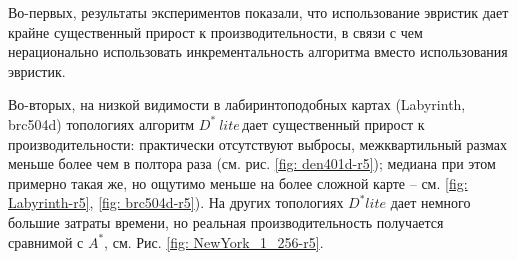 \documentclass[11pt]{article}
\newcommand{\dstarlite}{\(D^*\ lite\)\,}
\begin{document}
    Во-первых, результаты экспериментов показали, что использование эвристик дает крайне существенный прирост к производительности, в связи с чем нерационально использовать инкрементальность алгоритма вместо использования эвристик.

    Во-вторых, на низкой видимости в лабиринтоподобных картах (Labyrinth, brc504d) топологиях алгоритм \dstarlite дает существенный прирост к производительности: практически отсутствуют выбросы, межквартильный размах меньше более чем в полтора раза (см. рис. \ref{fig: den401d-r5}); медиана при этом примерно такая же, но ощутимо меньше на более сложной карте -- см. \ref{fig: Labyrinth-r5}, \ref{fig: brc504d-r5}).
    На других топологиях $D^* lite$ дает немного большие затраты времени, но реальная производительность получается сравнимой с $A^*$, см. Рис. \ref{fig: NewYork_1_256-r5}.
\end{document}
